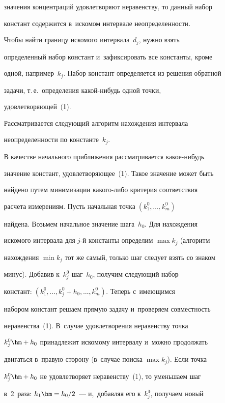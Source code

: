 значения концентраций удовлетворяют неравенству, то данный набор 

констант содержится в~искомом интервале неопределенности.

  

  Чтобы найти границу искомого интервала~$d_j$, нужно взять 

определенный набор констант и~зафиксировать все константы, кроме 

одной, например~$k_j$. Набор констант определяется из решения обратной 

задачи, т.\,е.\ определения ка\-кой-ни\-будь одной точки, 

удовлетворяющей~(1). 

  

  Рассматривается следующий алгоритм нахождения интервала 

неопределенности по константе~$k_j$.

  

  В качестве начального приближения рассматривается ка\-кое-ни\-будь 

значение констант, удовлетворяющее~(1). Такое значение может быть 

найдено путем минимизации ка\-ко\-го-ли\-бо критерия соответствия 

расчета измерениям. Пусть начальная точка $(k_1^0,\ldots , k_m^0)$ 

найдена. Возьмем начальное значение шага~$h_0$. Для нахождения 

искомого интервала для $j$-й константы определим $\max k_j$ (алгоритм 

нахождения $\min k_j$ тот же самый, только шаг следует взять со знаком 

минус). Добавив к~$k_j^0$ шаг~$h_0$, получим следующий набор 

констант: $(k_1^0, \ldots , k_j^0+h_0, \ldots , k_m^0)$. Теперь с~имеющимся 

набором констант решаем прямую задачу и~проверяем совместность 

неравенства~(1). В~случае удовлетворения неравенству точка 

$k_j^0\hm+h_0$ принадлежит искомому интервалу и~можно продолжать 

двигаться в~правую сторону (в~случае поиска $\max k_j$). Если точка 

$k_j^0\hm+h_0$ не удовлетворяет неравенству~(1), то уменьшаем шаг 

в~2~раза: $h_1\hm= h_0/2$~--- и,~добавляя его к~$k_j^0$, получаем новый 

